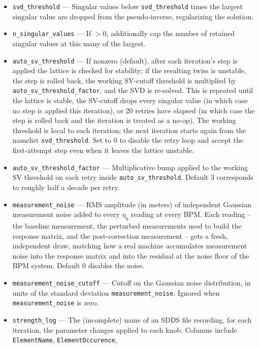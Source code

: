 \documentclass[11pt]{article}
\begin{document}
\begin{itemize}
  this command builds the matrix itself (only relevant when
  \verb|use_perturbed_matrix>0| or when no preloaded matrix exists).
\item \verb|svd_threshold| --- Singular values below
  \verb|svd_threshold| times the largest singular value are dropped from
  the pseudo-inverse, regularizing the solution.
\item \verb|n_singular_values| --- If $>0$, additionally cap the number of
  retained singular values at this many of the largest.
\item \verb|auto_sv_threshold| --- If nonzero (default), after each iteration's
  step is applied the lattice is checked for stability; if the resulting twiss
  is unstable, the step is rolled back, the working SV-cutoff threshold is
  multiplied by \verb|auto_sv_threshold_factor|, and the SVD is re-solved.
  This is repeated until the lattice is stable, the SV-cutoff drops every
  singular value (in which case no step is applied this iteration), or 20
  retries have elapsed (in which case the step is rolled back and the
  iteration is treated as a no-op).  The working threshold is local to each
  iteration; the next iteration starts again from the namelist
  \verb|svd_threshold|.  Set to 0 to disable the retry loop and accept the
  first-attempt step even when it leaves the lattice unstable.
\item \verb|auto_sv_threshold_factor| --- Multiplicative bump applied to the
  working SV threshold on each retry inside \verb|auto_sv_threshold|.  Default
  3 corresponds to roughly half a decade per retry.
\item \verb|measurement_noise| --- RMS amplitude (in meters) of independent Gaussian
  measurement noise added to every $\eta_y$ reading at every BPM.  Each
  reading -- the baseline measurement, the perturbed measurements used to
  build the response matrix, and the post-correction measurement -- gets a
  fresh, independent draw, matching how a real machine accumulates
  measurement noise into the response matrix and into the residual at the
  noise floor of the BPM system.  Default 0 disables the noise.  
\item \verb|measurement_noise_cutoff| --- Cutoff on the Gaussian noise distribution,
  in units of the standard deviation \verb|measurement_noise|.  Ignored when
  \verb|measurement_noise| is zero.
\item \verb|strength_log| --- The (incomplete) name of an SDDS file
  recording, for each iteration, the parameter changes applied to each
  knob.  Columns include \verb|ElementName|, \verb|ElementOccurence|,

\end{itemize}
\end{document}
